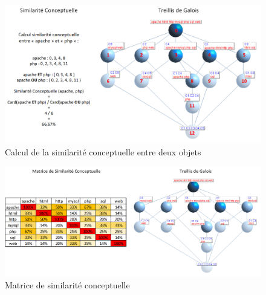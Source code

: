 \begin{figure}[htb!]
\centering
\centerline{  %
\includegraphics[scale=1]{2-Etat-de-l'Art/images/ACF/Metriques/exemple_similarite-conceptuelle_calcul.png}
}
\caption{Calcul de la similarité conceptuelle entre deux objets}
\label{figure:2-S2-Metriques-SimilariteConceptuelle-Exemple}
\end{figure}

\hspace{0pt}
\vfill

\newpage %

\begin{figure}[htb!]
\centering
\centerline{  %
\includegraphics[scale=0.85]{2-Etat-de-l'Art/images/ACF/Metriques/exemple_similarite-conceptuelle_matrice.png}
}
\caption{Matrice de similarité conceptuelle}
\label{figure:2-S2-Metriques-SimilariteConceptuelle-Matrice}
\end{figure}


\bigskip

